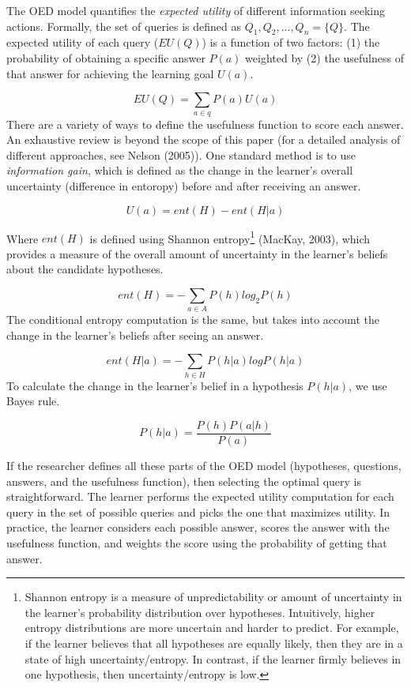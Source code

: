 \documentclass[oneside]{report}
\begin{document}
The OED model quantifies the \emph{expected utility} of different
information seeking actions. Formally, the set of queries is defined as
\(Q_1, Q_2,..., Q_n = \{Q\}\). The expected utility of each query
(\(EU(Q)\)) is a function of two factors: (1) the probability of
obtaining a specific answer \(P(a)\) weighted by (2) the usefulness of
that answer for achieving the learning goal \(U(a)\).

\[EU(Q) = \sum_{a\in q}{P(a)U(a)}\] \noindent
There are a variety of ways to define the usefulness function to score
each answer. An exhaustive review is beyond the scope of this paper (for
a detailed analysis of different approaches, see Nelson (2005)). One
standard method is to use \emph{information gain}, which is defined as
the change in the learner's overall uncertainty (difference in entoropy)
before and after receiving an answer.

\[U(a) = ent(H) - ent(H|a)\]

\noindent
Where \(ent(H)\) is defined using Shannon entropy\footnote{Shannon
  entropy is a measure of unpredictability or amount of uncertainty in
  the learner's probability distribution over hypotheses. Intuitively,
  higher entropy distributions are more uncertain and harder to predict.
  For example, if the learner believes that all hypotheses are equally
  likely, then they are in a state of high uncertainty/entropy. In
  contrast, if the learner firmly believes in one hypothesis, then
  uncertainty/entropy is low.} (MacKay, 2003), which provides a measure
of the overall amount of uncertainty in the learner's beliefs about the
candidate hypotheses.

\[ent(H) = -\sum_{a\in A}{P(h)log_2P(h)}\] \noindent
The conditional entropy computation is the same, but takes into account
the change in the learner's beliefs after seeing an answer.

\[ ent(H|a) = -\sum_{h\in H}{P(h|a)logP(h|a)} \] \noindent
To calculate the change in the learner's belief in a hypothesis
\(P(h|a)\), we use Bayes rule.

\[ P(h|a) = \frac{P(h)P(a|h)}{P(a)} \]

\noindent
If the researcher defines all these parts of the OED model (hypotheses,
questions, answers, and the usefulness function), then selecting the
optimal query is straightforward. The learner performs the expected
utility computation for each query in the set of possible queries and
picks the one that maximizes utility. In practice, the learner considers
each possible answer, scores the answer with the usefulness function,
and weights the score using the probability of getting that answer.
\end{document}
